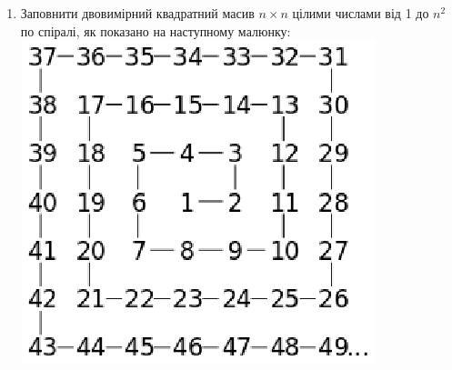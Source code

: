 \documentclass[]{article}
\begin{document}
\begin{enumerate}
\item
  Заповнити двовимірний квадратний масив $n\times n$ цілими числами від 1 до $n^2$ по
  спіралі, як показано на наступному малюнку:\\
  \includegraphics{spiral5}
   

\end{enumerate}
\end{document}
